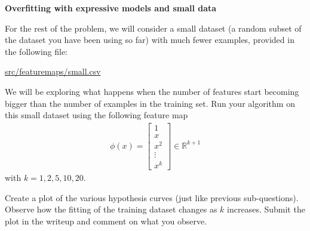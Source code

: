 \item {} {\bf Overfitting with expressive models and small data}

For the rest of the problem, we will consider a small
dataset (a random subset of the dataset you have been using so far) with much fewer examples, provided in
the following file:
%
\begin{center}
	\url{src/featuremaps/small.csv}
\end{center}
%

We will be exploring what happens when the number of features start becoming bigger than the number of 
examples in the training set. Run your algorithm on this small dataset using the following feature map 
\begin{align}
\phi(x) = \left[\begin{array}{c} 1\\ x \\ x^2\\ \vdots \\x^k \end{array}\right]\in \mathbb{R}^{k+1} 
\end{align}
with $k = 1,2,5,10,20$. 

Create a plot of the various hypothesis curves (just like previous sub-questions). Observe how the fitting of the training dataset changes as $k$ increases. Submit the plot in the writeup and comment on what you observe.

